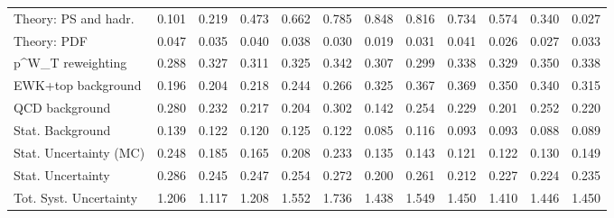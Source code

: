 \begin{tabular}{l|p{0.6cm}p{0.6cm}p{0.6cm}p{0.6cm}p{0.6cm}p{0.6cm}p{0.6cm}p{0.6cm}p{0.6cm}p{0.6cm}p{0.6cm}}
Theory: PS and hadr.                     & 0.101 & 0.219 & 0.473 & 0.662 & 0.785 & 0.848 & 0.816 & 0.734 & 0.574 & 0.340 & 0.027 \\
Theory: PDF                              & 0.047 & 0.035 & 0.040 & 0.038 & 0.030 & 0.019 & 0.031 & 0.041 & 0.026 & 0.027 & 0.033 \\
p^{W}_{T} reweighting                    & 0.288 & 0.327 & 0.311 & 0.325 & 0.342 & 0.307 & 0.299 & 0.338 & 0.329 & 0.350 & 0.338 \\
EWK+top background                       & 0.196 & 0.204 & 0.218 & 0.244 & 0.266 & 0.325 & 0.367 & 0.369 & 0.350 & 0.340 & 0.315 \\
QCD background                           & 0.280 & 0.232 & 0.217 & 0.204 & 0.302 & 0.142 & 0.254 & 0.229 & 0.201 & 0.252 & 0.220 \\
Stat. Background                         & 0.139 & 0.122 & 0.120 & 0.125 & 0.122 & 0.085 & 0.116 & 0.093 & 0.093 & 0.088 & 0.089 \\
Stat. Uncertainty (MC)                   & 0.248 & 0.185 & 0.165 & 0.208 & 0.233 & 0.135 & 0.143 & 0.121 & 0.122 & 0.130 & 0.149 \\
\hline
Stat. Uncertainty                        & 0.286 & 0.245 & 0.247 & 0.254 & 0.272 & 0.200 & 0.261 & 0.212 & 0.227 & 0.224 & 0.235 \\
\hline
Tot. Syst. Uncertainty                   & 1.206 & 1.117 & 1.208 & 1.552 & 1.736 & 1.438 & 1.549 & 1.450 & 1.410 & 1.446 & 1.450 \\
\hline
\end{tabular}
